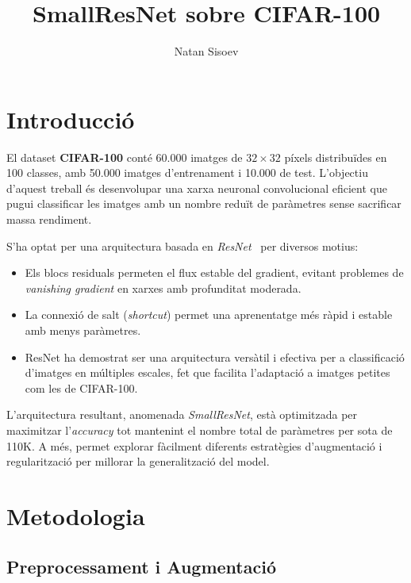 \documentclass[9pt,a4paper,twoside]{tau-class/tau}
\title{SmallResNet sobre CIFAR-100}
\author[a,1]{Natan Sisoev}
\affil[a]{1706198}
\begin{document}
    \maketitle
    \thispagestyle{firststyle} \tauabstract
    \tableofcontents
    \linenumbers


\section{Introducció}

    El dataset \textbf{CIFAR-100} conté 60.000 imatges de $32{\times}32$ píxels distribuïdes
    en 100 classes, amb 50.000 imatges d'entrenament i 10.000 de test. L'objectiu d'aquest
    treball és desenvolupar una xarxa neuronal convolucional eficient que pugui classificar
    les imatges amb un nombre reduït de paràmetres sense sacrificar massa rendiment.
    
    S'ha optat per una arquitectura basada en \textit{ResNet}~\cite{he2016deep} per diversos motius:
    \begin{itemize}
        \item Els blocs residuals permeten el flux estable del gradient, evitant problemes de
              \textit{vanishing gradient} en xarxes amb profunditat moderada.
        \item La connexió de salt (\textit{shortcut}) permet una aprenentatge més ràpid i estable
              amb menys paràmetres.
        \item ResNet ha demostrat ser una arquitectura versàtil i efectiva per a classificació
              d'imatges en múltiples escales, fet que facilita l'adaptació a imatges petites
              com les de CIFAR-100.
    \end{itemize}
    
    L'arquitectura resultant, anomenada \textit{SmallResNet}, està optimitzada per maximitzar
    l'\textit{accuracy} tot mantenint el nombre total de paràmetres per sota de 110K.
    A més, permet explorar fàcilment diferents estratègies d'augmentació i regularització
    per millorar la generalització del model.

\section{Metodologia}
    \subsection{Preprocessament i Augmentació}
    
\end{document}
